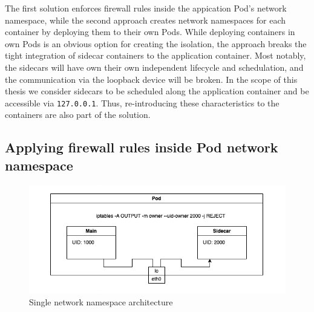 \documentclass[english, 12pt, a4paper, sci, utf8, a-2b, online]{aaltothesis}
\begin{document}
The first solution enforces firewall rules inside the appication Pod's network namespace, while the second approach creates network namespaces for each container by deploying them to their own Pods. While deploying containers in own Pods is an obvious option for creating the isolation, the approach breaks the tight integration of sidecar containers to the application container. Most notably, the sidecars will have own their own independent lifecycle and schedulation, and the communication via the loopback device will be broken. In the scope of this thesis we consider sidecars to be scheduled along the application container and be accessible via \texttt{127.0.0.1}. Thus, re-introducing these characteristics to the containers are also part of the solution.

\subsection{Applying firewall rules inside Pod network namespace}






\begin{figure}[h!]
  \centering
  \includegraphics[width=\linewidth]{files/iptables.png}
  \caption{Single network namespace architecture}
  \label{fig:single-net-solution}
\end{figure}
\end{document}
